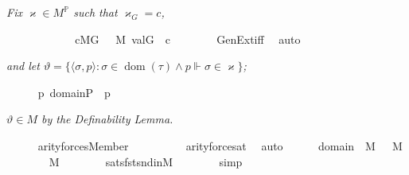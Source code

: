 \textit{Fix $\varkappa \in M^{\mathbb{P}}$ such that
  $\varkappa_{G}=c$,}
\begin{isabelle}
\ \ \ \ \isamarkupfalse%
\isanewline
\ \ \ \ \isamarkupfalse%
\ {\isasymchi}\ \ {\isachardoublequoteopen}c{\isasymin}M{\isacharbrackleft}{\kern0pt}G{\isacharbrackright}{\kern0pt}{\isachardoublequoteclose}\ {\isachardoublequoteopen}{\isasymchi}\ {\isasymin}\ M{\isachardoublequoteclose}\ {\isachardoublequoteopen}val{\isacharparenleft}{\kern0pt}G{\isacharcomma}{\kern0pt}{\isasymchi}{\isacharparenright}{\kern0pt}\ {\isacharequal}{\kern0pt}\ c{\isachardoublequoteclose}\isanewline
\ \ \ \ \ \ \isamarkupfalse%
\ GenExt{\isacharunderscore}{\kern0pt}iff\ \isamarkupfalse%
\ auto
\end{isabelle}
\textit{and let $\vartheta=\{\langle\sigma, p\rangle:
  \sigma \in \operatorname{dom}(\tau) \wedge p \Vdash \sigma \in
  \varkappa\}$;}
\begin{isabelle}
\ \ \ \ \isamarkupfalse%
\ {\isacharquery}{\kern0pt}{\isasymtheta}{\isacharequal}{\kern0pt}{\isachardoublequoteopen}{\isacharbraceleft}{\kern0pt}{\isasymlangle}{\isasymsigma}{\isacharcomma}{\kern0pt}p{\isasymrangle}\ {\isasymin}domain{\isacharparenleft}{\kern0pt}{\isasymtau}{\isacharparenright}{\kern0pt}{\isasymtimes}P\ {\isachardot}{\kern0pt}\ p\ {\isasymtturnstile}\ {\isasymcdot}{}\ {\isasymin}\ {}{\isasymcdot}\ {\isacharbrackleft}{\kern0pt}{\isasymsigma}{\isacharcomma}{\kern0pt}{\isasymchi}{\isacharbrackright}{\kern0pt}\ {\isacharbraceright}{\kern0pt}{\isachardoublequoteclose}
\end{isabelle}
\textit{$\vartheta \in M$ by the Definability Lemma.}
\begin{isabelle}
\ \ \ \ \isamarkupfalse%
\ {\isachardoublequoteopen}arity{\isacharparenleft}{\kern0pt}forces{\isacharparenleft}{\kern0pt}Member{\isacharparenleft}{\kern0pt}{}{\isacharcomma}{\kern0pt}{}{\isacharparenright}{\kern0pt}{\isacharparenright}{\kern0pt}{\isacharparenright}{\kern0pt}\ {\isacharequal}{\kern0pt}\ {}{\isachardoublequoteclose}\isanewline
\ \ \ \ \ \ \isamarkupfalse%
\ arity{\isacharunderscore}{\kern0pt}forces{\isacharunderscore}{\kern0pt}at\ \isamarkupfalse%
\ auto\isanewline
\ \ \ \ \isamarkupfalse%
\ {\isacartoucheopen}domain{\isacharparenleft}{\kern0pt}{\isasymtau}{\isacharparenright}{\kern0pt}\ {\isasymin}\ M{\isacartoucheclose}\ {\isacartoucheopen}{\isasymchi}\ {\isasymin}\ M{\isacartoucheclose}\isanewline
\ \ \ \ \isamarkupfalse%
\ {\isachardoublequoteopen}{\isacharquery}{\kern0pt}{\isasymtheta}\ {\isasymin}\ M{\isachardoublequoteclose}\isanewline
\ \ \ \ \ \ \isamarkupfalse%
\ sats{\isacharunderscore}{\kern0pt}fst{\isacharunderscore}{\kern0pt}snd{\isacharunderscore}{\kern0pt}in{\isacharunderscore}{\kern0pt}M\isanewline
\ \ \ \ \ \ \isamarkupfalse%
\ simp
\end{isabelle}
